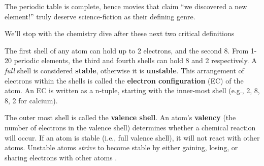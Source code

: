 \begin{Tip} The periodic table is complete, hence movies that claim ``we discovered a new element!'' truly deserve science-fiction as their defining genre.
\end{Tip}
\newpage 
\noindent
We'll stop with the chemistry dive after these next two critical definitions

\begin{Def}

    \label{def:valence_electrons}

    The first shell of any atom can hold up to 2 electrons, and the second 8. From 1-20 periodic elements, the third and fourth 
    shells can hold 8 and 2 respectively. A \emph{full} shell is considered \textbf{stable}, otherwise it is \textbf{unstable}.
    This arrangement of electrons within the shells is called the \textbf{electron configuration} (EC) of the atom.
    An EC is written as a n-tuple, starting with the inner-most shell (e.g., 2, 8, 8, 2 for calcium).

    
    The outer most shell is called the \textbf{valence shell}. An atom's \textbf{valency} (the number of electrons in the valence shell) determines whether a chemical reaction will occur.
     If an atom is stable (i.e., full valence shell), it will not react with other atoms.
    Unstable atoms \emph{strive} to become stable by either gaining, losing, or sharing electrons with other atoms \cite{infinitylearn2018concept}.
\end{Def}

